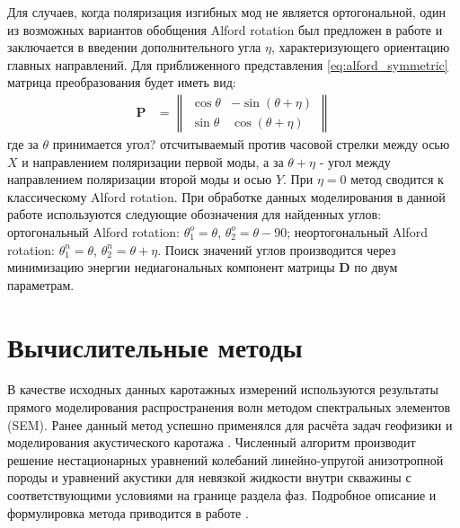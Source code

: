 \documentclass[a4paper,11pt]{article}
\begin{document}
Для случаев, когда поляризация изгибных мод не является ортогональной, один из возможных вариантов обобщения Alford rotation был предложен в работе \cite{Dellinger1998} и заключается в введении дополнительного угла $\eta$, характеризующего ориентацию главных направлений. Для приближенного представления \eqref{eq:alford_symmetric} матрица преобразования будет иметь вид:
\begin{align*}
\mathbf{P} &= \left\|
\begin{array}{cc}
\cos \theta & -\sin (\theta+\eta) \\ 
\sin \theta & \cos (\theta+\eta)
\end{array} 
\right\|
\end{align*}
где за $\theta$ принимается угол? отсчитываемый против часовой стрелки между осью $X$ и направлением поляризации первой моды, а за $\theta + \eta$ - угол между направлением поляризации второй моды и осью $Y$. При $\eta=0$ метод сводится к классическому Alford rotation. При обработке данных моделирования в данной работе используются следующие обозначения для найденных углов: ортогональный Alford rotation: $\theta_1^o=\theta$, $\theta_2^o=\theta-90$; неортогональный Alford rotation: $\theta_1^n=\theta$, $\theta_2^n=\theta+\eta$. Поиск значений углов производится через минимизацию энергии недиагональных компонент матрицы $\mathbf{D}$ по двум параметрам.


\section{Вычислительные методы}
В качестве исходных данных каротажных измерений используются результаты прямого моделирования распространения волн методом спектральных элементов (SEM). Ранее данный метод успешно применялся для расчёта задач геофизики \cite{Komatitsch1999} и моделирования акустического каротажа \cite{Charara2011}. Численный алгоритм производит решение нестационарных уравнений колебаний линейно-упругой анизотропной породы и уравнений акустики для невязкой жидкости внутри скважины с соответствующими условиями на границе раздела фаз. Подробное описание и формулировка метода приводится в работе \cite{Komatitsch1999}.
\end{document}
